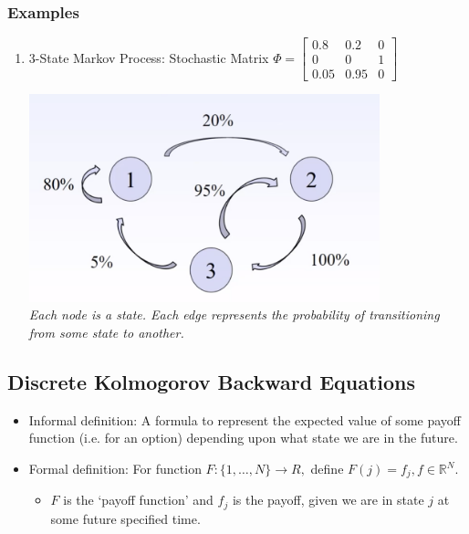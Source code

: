 \documentclass{article}
\begin{document}
\subsubsection{Examples}
\begin{enumerate}
    \item 3-State Markov Process: Stochastic Matrix $ \Phi = \begin{bmatrix}
        0.8 & 0.2 & 0 \\
        0 & 0 & 1 \\
        0.05 & 0.95 & 0 
        \end{bmatrix} $
        \begin{center}
            \centering
            \includegraphics[width=0.8\textwidth]{imgs/stochastic_matrices1.png} \\
            \textit{Each node is a state. Each edge represents the probability of 
            transitioning from some state to another.}
        \end{center}
\end{enumerate}

\subsection{Discrete Kolmogorov Backward Equations}
\begin{itemize}
    \item Informal definition: 
    A formula to represent the expected value of some payoff function (i.e. for
    an option) depending upon what state we are in the future.
    \item Formal definition: For function $ F : \{ 1, \dots, N \}  \rightarrow R
    , $ define $ F(j) = f_j, f \in \mathbb{R}^N $.
    \begin{itemize}
        \item $ F $ is the `payoff function' and $ f_j $ is the payoff, given we 
        are in state $ j $ at some future specified time.
    \end{itemize}
\end{itemize}
\end{document}
